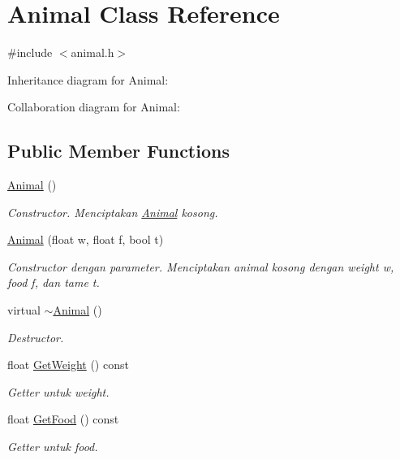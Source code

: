 \hypertarget{classAnimal}{}\section{Animal Class Reference}
\label{classAnimal}


{\ttfamily \#include $<$animal.\+h$>$}



Inheritance diagram for Animal\+:


Collaboration diagram for Animal\+:
\subsection*{Public Member Functions}
\begin{DoxyCompactItemize}
\item 
\hyperlink{classAnimal_a1e726a49ec952443190ac62dad22353c}{Animal} ()
\begin{DoxyCompactList}\small\item\em Constructor. Menciptakan \hyperlink{classAnimal}{Animal} kosong. \end{DoxyCompactList}\item 
\hyperlink{classAnimal_acc6020247b7d154583137a89c06971be}{Animal} (float w, float f, bool t)
\begin{DoxyCompactList}\small\item\em Constructor dengan parameter. Menciptakan animal kosong dengan weight w, food f, dan tame t. \end{DoxyCompactList}\item 
virtual \hyperlink{classAnimal_a16d8b7f94611cc65f5cdb58cc105527b}{$\sim$\+Animal} ()
\begin{DoxyCompactList}\small\item\em Destructor. \end{DoxyCompactList}\item 
float \hyperlink{classAnimal_a84b2804414e0c5113a4fe1ca03fc3fff}{Get\+Weight} () const 
\begin{DoxyCompactList}\small\item\em Getter untuk weight. \end{DoxyCompactList}\item 
float \hyperlink{classAnimal_a284817c8f57078ebce4fd1f17d824223}{Get\+Food} () const 
\begin{DoxyCompactList}\small\item\em Getter untuk food. \end{DoxyCompactList}\item 

\end{DoxyCompactItemize}
